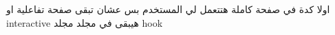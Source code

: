 اولا كدة في صفحة كاملة هتتعمل لي المستخدم بس عشان تبقى صفحة تفاعلية او
interactive
هيبقى في مجلد مجلد hook